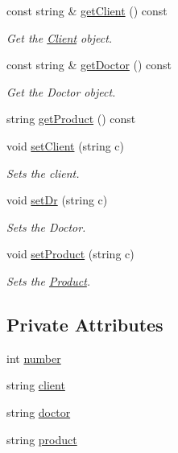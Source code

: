 \begin{DoxyCompactItemize}
const string \& \hyperlink{classPrescription_aaf2631c310511731d1538b9129b1ad04}{get\+Client} () const
\begin{DoxyCompactList}\small\item\em Get the \hyperlink{classClient}{Client} object. \end{DoxyCompactList}\item 
const string \& \hyperlink{classPrescription_aba0ddace1c50e0f708d1f8e427263e0f}{get\+Doctor} () const
\begin{DoxyCompactList}\small\item\em Get the Doctor object. \end{DoxyCompactList}\item 
string \hyperlink{classPrescription_aca98893524a101d4b42fd5ef4ea1ed51}{get\+Product} () const
\item 
void \hyperlink{classPrescription_a2c0f9433fda32c1ef8d4e96ff3b965b0}{set\+Client} (string c)
\begin{DoxyCompactList}\small\item\em Sets the client. \end{DoxyCompactList}\item 
void \hyperlink{classPrescription_ac2623f2ff21c5b0b454913c66e5f40a0}{set\+Dr} (string c)
\begin{DoxyCompactList}\small\item\em Sets the Doctor. \end{DoxyCompactList}\item 
void \hyperlink{classPrescription_a2594567d8bbb03cf18710db571c0cb64}{set\+Product} (string c)
\begin{DoxyCompactList}\small\item\em Sets the \hyperlink{classProduct}{Product}. \end{DoxyCompactList}\end{DoxyCompactItemize}
\subsection*{Private Attributes}
\begin{DoxyCompactItemize}
\item 
int \hyperlink{classPrescription_a4b3dcfe55dff479143e63cf7778ffa12}{number}
\item 
string \hyperlink{classPrescription_a3a2d122c0229cd7985595cae3ab497c3}{client}
\item 
string \hyperlink{classPrescription_abf1e3c58a207e521294815884ffc6682}{doctor}
\item 
string \hyperlink{classPrescription_ab9556fbe876105624867e2f360617688}{product}
\end{DoxyCompactItemize}
